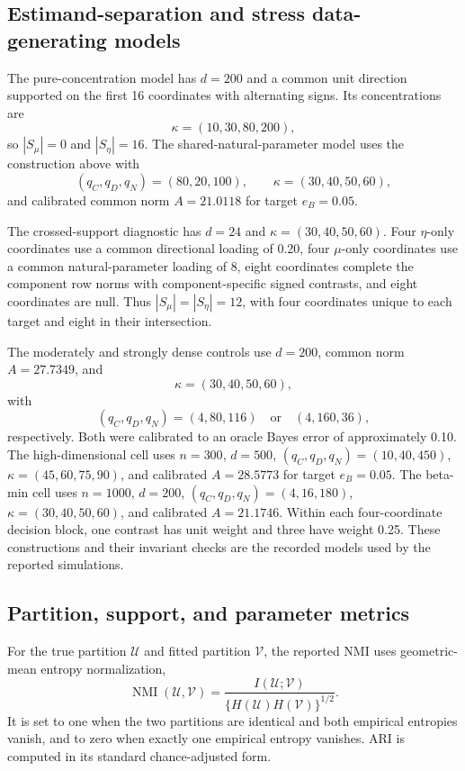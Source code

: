 \documentclass[preprint,12pt,authoryear]{elsarticle}
\begin{document}
\subsection{Estimand-separation and stress data-generating models}

The pure-concentration model has $d=200$ and a common unit direction supported
on the first 16 coordinates with alternating signs. Its concentrations are
\[
\kappa=(10,30,80,200),
\]
so $|S_\mu|=0$ and $|S_\eta|=16$. The shared-natural-parameter model uses the
construction above with
\[
(q_C,q_D,q_N)=(80,20,100),
\qquad
\kappa=(30,40,50,60),
\]
and calibrated common norm $A=21.0118$ for target $e_B=0.05$.

The crossed-support diagnostic has $d=24$ and
$\kappa=(30,40,50,60)$. Four $\eta$-only coordinates use a common directional
loading of 0.20, four $\mu$-only coordinates use a common natural-parameter
loading of 8, eight coordinates complete the component row norms with
component-specific signed contrasts, and eight coordinates are null. Thus
$|S_\mu|=|S_\eta|=12$, with four coordinates unique to each target and eight
in their intersection.

The moderately and strongly dense controls use $d=200$, common norm
$A=27.7349$, and
\[
\kappa=(30,40,50,60),
\]
with
\[
(q_C,q_D,q_N)=(4,80,116)
\quad\text{or}\quad
(4,160,36),
\]
respectively. Both were calibrated to an oracle Bayes error of approximately
0.10. The
high-dimensional cell uses $n=300$, $d=500$,
$(q_C,q_D,q_N)=(10,40,450)$, $\kappa=(45,60,75,90)$, and calibrated
$A=28.5773$ for target $e_B=0.05$. The beta-min cell uses $n=1000$, $d=200$,
$(q_C,q_D,q_N)=(4,16,180)$, $\kappa=(30,40,50,60)$, and calibrated
$A=21.1746$. Within each four-coordinate decision block, one contrast has
unit weight and three have weight 0.25. These constructions and their
invariant checks are the recorded models used by the reported simulations.

\subsection{Partition, support, and parameter metrics}
\label{sec:support-metrics}

For the true partition $\mathcal U$ and fitted partition $\mathcal V$, the
reported NMI uses geometric-mean entropy normalization,
\[
\operatorname{NMI}(\mathcal U,\mathcal V)
=\frac{I(\mathcal U;\mathcal V)}
{\{H(\mathcal U)H(\mathcal V)\}^{1/2}}.
\]
It is set to one when the two partitions are identical and both empirical
entropies vanish, and to zero when exactly one empirical entropy vanishes.
ARI is computed in its standard chance-adjusted form.
\end{document}
